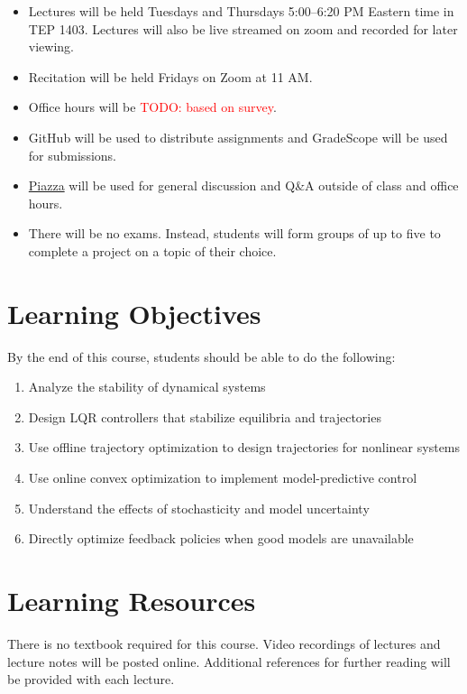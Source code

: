 \documentclass[11pt,letterpaper]{article}
\newcommand{\todo}[1]{\textcolor{red}{TODO: #1}}
\begin{document}
\begin{itemize}
	\item Lectures will be held Tuesdays and Thursdays 5:00--6:20 PM Eastern time in TEP 1403. Lectures will also be live streamed on zoom and recorded for later viewing.
	\item Recitation will be held Fridays on Zoom at 11 AM.
	\item Office hours will be \todo{based on survey}.
	\item GitHub will be used to distribute assignments and GradeScope will be used for submissions.
	\item \href{https://piazza.com/cmu/spring2024/16745/home}{Piazza} will be used for general discussion and Q\&A outside of class and office hours.
	\item There will be no exams. Instead, students will form groups of up to five to complete a project on a topic of their choice.
\end{itemize}

\section*{Learning Objectives}
By the end of this course, students should be able to do the following:
\begin{enumerate}
	\item Analyze the stability of dynamical systems
	\item Design LQR controllers that stabilize equilibria and trajectories
	\item Use offline trajectory optimization to design trajectories for nonlinear systems
	\item Use online convex optimization to implement model-predictive control
	\item Understand the effects of stochasticity and model uncertainty
	\item Directly optimize feedback policies when good models are unavailable
\end{enumerate}

\section*{Learning Resources}

There is no textbook required for this course. Video recordings of lectures and lecture notes will be posted online. Additional references for further reading will be provided with each lecture.
\end{document}
